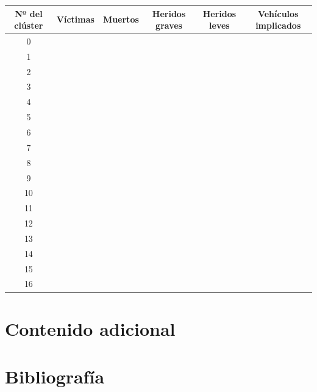 \documentclass[a4]{article}
\begin{document}
\newpage
\begin{center}
\begin{tabular}{|c|c|c|c|c|c|}
\hline
\multicolumn{1}{|c|}{\textbf{Nº del clúster}} & \textbf{Víctimas} & \textbf{Muertos} & \textbf{Heridos graves} & \textbf{Heridos leves} & \textbf{Vehículos implicados}\\ \hline
  0  &  &  &  &  &  \\ \hline
  1  &  &  &  &  &  \\ \hline
  2  &  &  &  &  &  \\ \hline
  3  &  &  &  &  &  \\ \hline
  4  &  &  &  &  &  \\ \hline
  5  &  &  &  &  &  \\ \hline
  6  &  &  &  &  &  \\ \hline
  7  &  &  &  &  &  \\ \hline
  8  &  &  &  &  &  \\ \hline
  9  &  &  &  &  &  \\ \hline
 10  &  &  &  &  &  \\ \hline
 11  &  &  &  &  &  \\ \hline
 12  &  &  &  &  &  \\ \hline
 13  &  &  &  &  &  \\ \hline
 14  &  &  &  &  &  \\ \hline
 15  &  &  &  &  &  \\ \hline
 16  &  &  &  &  &  \\ \hline
\end{tabular}
\end{center}

\newpage
\section{Contenido adicional}
\section{Bibliografía}
\end{document}
